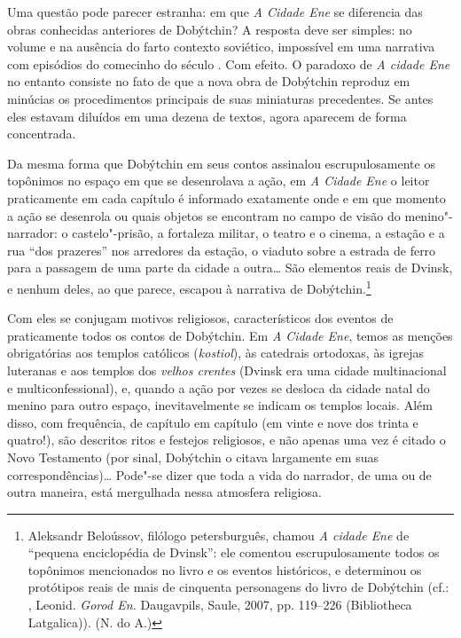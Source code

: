 Uma questão pode parecer estranha: em que \emph{A Cidade Ene} se
diferencia das obras conhecidas anteriores de Dobýtchin? A resposta deve
ser simples: no volume e na ausência do farto contexto soviético,
impossível em uma narrativa com episódios do comecinho do século \scalebox{.8}{XX}. Com
efeito. O paradoxo de \emph{A cidade Ene} no entanto consiste no fato de
que a nova obra de Dobýtchin reproduz em minúcias os procedimentos
principais de suas miniaturas precedentes. Se antes eles estavam
diluídos em uma dezena de textos, agora aparecem de forma concentrada.

Da mesma forma que Dobýtchin em seus contos assinalou escrupulosamente
os topônimos no espaço em que se desenrolava a ação, em \emph{A Cidade
Ene} o leitor praticamente em cada capítulo é informado exatamente onde
e em que momento a ação se desenrola ou quais objetos se encontram no
campo de visão do menino"-narrador: o castelo"-prisão, a fortaleza
militar, o teatro e o cinema, a estação e a rua ``dos prazeres'' nos
arredores da estação, o viaduto sobre a estrada de ferro para a passagem
de uma parte da cidade a outra\ldots{} São elementos reais de Dvinsk, e
nenhum deles, ao que parece, escapou à narrativa de Dobýtchin.\footnote{Aleksandr
  Beloússov, filólogo petersburguês, chamou \emph{A cidade Ene} de
  ``pequena enciclopédia de Dvinsk'': ele comentou escrupulosamente
  todos os topônimos mencionados no livro e os eventos históricos, e
  determinou os protótipos reais de mais de cinquenta personagens do
  livro de Dobýtchin (cf.: \scalebox{.8}{DOBÝTCHIN}, Leonid. \emph{Gorod En.}
  Daugavpils, Saule, 2007, pp. 119--226 (Bibliotheca Latgalica)). (N. do
  A.)}

Com eles se conjugam motivos religiosos, característicos dos eventos de
praticamente todos os contos de Dobýtchin. Em \emph{A Cidade Ene}, temos
as menções obrigatórias aos templos católicos (\emph{kostiol}), às
catedrais ortodoxas, às igrejas luteranas e aos templos dos \emph{velhos
crentes} (Dvinsk era uma cidade multinacional e multiconfessional), e,
quando a ação por vezes se desloca da cidade natal do menino para outro
espaço, inevitavelmente se indicam os templos locais. Além disso, com
frequência, de capítulo em capítulo (em vinte e nove dos trinta e
quatro!), são descritos ritos e festejos religiosos, e não apenas uma
vez é citado o Novo Testamento (por sinal, Dobýtchin o citava largamente
em suas correspondências)\ldots{} Pode"-se dizer que toda a vida do narrador,
de uma ou de outra maneira, está mergulhada nessa atmosfera religiosa.

